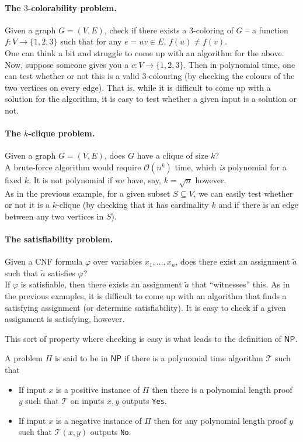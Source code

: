 \paragraph{The $3$-colorability problem.}
Given a graph $G=(V,E)$, check if there exists a $3$-coloring of $G$ -- a function $f:V\to\{1,2,3\}$ such that for any $e=uv \in E$, $f(u) \neq f(v)$.\\
One can think a bit and struggle to come up with an algorithm for the above. Now, suppose someone gives you a $c:V\to\{1,2,3\}$. Then in polynomial time, one can test whether or not this is a valid $3$-colouring (by checking the colours of the two vertices on every edge). That is, while it is difficult to come up with a solution for the algorithm, it is easy to test whether a given input is a solution or not.

\paragraph{The $k$-clique problem.}
Given a graph $G=(V,E)$, does $G$ have a clique of size $k$?\\
A brute-force algorithm would require $\mathcal{O}(n^k)$ time, which \textit{is} polynomial for a fixed $k$. It is not polynomial if we have, say, $k=\sqrt{n}$ however.\\
As in the previous example, for a given subset $S\subseteq V$, we can easily test whether or not it is a $k$-clique (by checking that it has cardinality $k$ and if there is an edge between any two vertices in $S$).

\paragraph{The satisfiability problem.}
Given a CNF formula $\varphi$ over variables $x_1,\ldots,x_n$, does there exist an assignment $\tilde{a}$ such that $\tilde{a}$ satisfies $\varphi$?\\
If $\varphi$ is satisfiable, then there exists an assignment $\tilde{a}$ that ``witnesses'' this. As in the previous examples, it is difficult to come up with an algorithm that finds a satisfying assignment (or determine satisfiability). It is easy to check if a given assignment is satisfying, however.

This sort of property where checking is easy is what leads to the definition of $\mathsf{NP}$.

\begin{fdef}
	A problem $\mathsf{\Pi}$ is said to be in $\mathsf{NP}$ if there is a polynomial time algorithm $\mathcal{T}$ such that
	\begin{itemize}
		\item If input $x$ is a positive instance of $\Pi$ then there is a polynomial length proof $y$ such that $\mathcal{T}$ on inputs $x,y$ outputs \texttt{Yes}.
		\item If input $x$ is a negative instance of $\Pi$ then for any polynomial length proof $y$ such that $\mathcal{T}(x,y)$ outputs \texttt{No}.
	\end{itemize}
\end{fdef}

